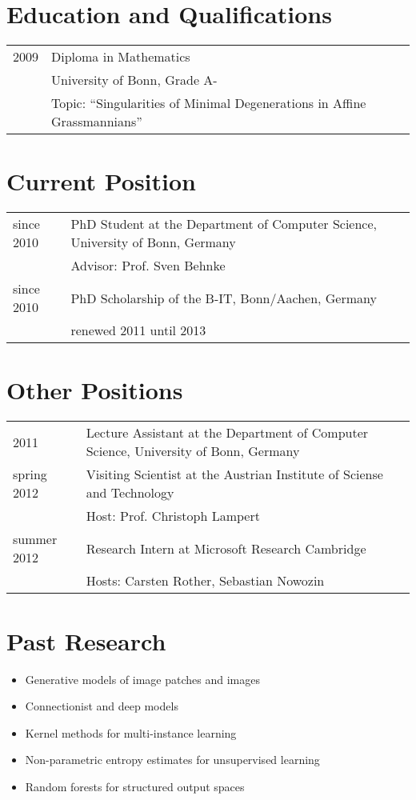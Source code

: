 \documentclass[a4paper,11pt]{article}
\begin{document}
\maketitle

\section{Education and Qualifications}
\begin{tabular}{lll}
    2009 & Diploma in Mathematics \\ & University of Bonn, Grade A-\\
         & Topic: ``Singularities of Minimal Degenerations in Affine Grassmannians''
\end{tabular}

\section{Current Position}
\begin{tabular}{lll}
    since 2010 & PhD Student at the Department of Computer Science, University of Bonn, Germany\\
               & Advisor: Prof. Sven Behnke\\
    since 2010 & PhD Scholarship of the B-IT, Bonn/Aachen, Germany\\
               & renewed 2011 until 2013\\
\end{tabular}

\section{Other Positions}
\begin{tabular}{lll}
    2011 & Lecture Assistant at the Department of Computer Science, University of Bonn, Germany \\
    spring 2012 & Visiting Scientist at the Austrian Institute of Sciense and Technology\\
               & Host: Prof. Christoph Lampert\\
    summer 2012 & Research Intern at Microsoft Research Cambridge\\
               & Hosts: Carsten Rother, Sebastian Nowozin\\
\end{tabular}


\section{Past Research}
\begin{itemize}
    \item Generative models of image patches and images
    \item Connectionist and deep models
    \item Kernel methods for multi-instance learning
    \item Non-parametric entropy estimates for unsupervised learning
    \item Random forests for structured output spaces
\end{itemize}
\end{document}
